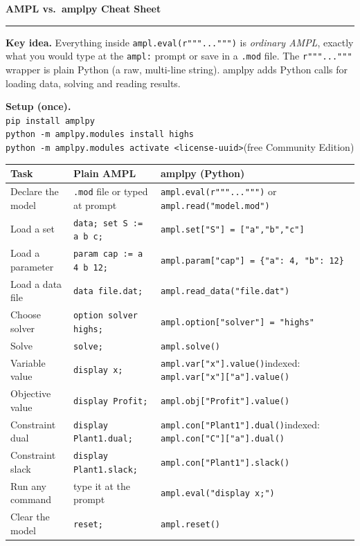 \documentclass[10pt]{article}
\newcommand{\code}[1]{\texttt{\small #1}}
\begin{document}
{\Large\bfseries AMPL vs.\ amplpy Cheat Sheet}\\[-2pt]
\rule{\linewidth}{0.6pt}

\textbf{Key idea.} Everything inside \code{ampl.eval(r"""...""")} is \emph{ordinary AMPL}, exactly what you would type at the \code{ampl:} prompt or save in a \code{.mod} file. The \code{r"""..."""} wrapper is plain Python (a raw, multi-line string). amplpy adds Python calls for loading data, solving and reading results.

\textbf{Setup (once).}\\
\code{pip install amplpy}\\
\code{python -m amplpy.modules install highs}\\
\code{python -m amplpy.modules activate <license-uuid>}\quad(free Community Edition)

\medskip
\begin{tabular}{@{}>{\raggedright\arraybackslash}p{1.3in}>{\raggedright\arraybackslash}p{2.3in}>{\raggedright\arraybackslash}p{3.2in}@{}}
\toprule
\textbf{Task} & \textbf{Plain AMPL} & \textbf{amplpy (Python)} \\
\midrule
Declare the model & \code{.mod} file or typed at prompt & \code{ampl.eval(r"""...""")} or \code{ampl.read("model.mod")} \\
Load a set & \code{data; set S := a b c;} & \code{ampl.set["S"] = ["a","b","c"]} \\
Load a parameter & \code{param cap := a 4 b 12;} & \code{ampl.param["cap"] = \{"a": 4, "b": 12\}} \\
Load a data file & \code{data file.dat;} & \code{ampl.read\_data("file.dat")} \\
Choose solver & \code{option solver highs;} & \code{ampl.option["solver"] = "highs"} \\
Solve & \code{solve;} & \code{ampl.solve()} \\
Variable value & \code{display x;} & \code{ampl.var["x"].value()}\quad indexed: \code{ampl.var["x"]["a"].value()} \\
Objective value & \code{display Profit;} & \code{ampl.obj["Profit"].value()} \\
Constraint dual & \code{display Plant1.dual;} & \code{ampl.con["Plant1"].dual()}\quad indexed: \code{ampl.con["C"]["a"].dual()} \\
Constraint slack & \code{display Plant1.slack;} & \code{ampl.con["Plant1"].slack()} \\
Run any command & type it at the prompt & \code{ampl.eval("display x;")} \\
Clear the model & \code{reset;} & \code{ampl.reset()} \\
\bottomrule
\end{tabular}
\end{document}

